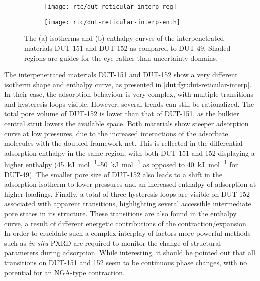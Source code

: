 \begin{figure}[htb]
    \centering
    \begin{subfigure}{0.5\linewidth}
        \texttt{[image: rtc/dut-reticular-interp-reg]}%
        \caption{}\label{dut:fgr:dut-reticular-interp-reg}
    \end{subfigure}%
    \begin{subfigure}{0.5\linewidth}
        \texttt{[image: rtc/dut-reticular-interp-enth]}%
        \caption{}\label{dut:fgr:dut-reticular-interp-enth}
    \end{subfigure}%
    \caption{The (a) isotherms and (b) enthalpy curves of the
    interpenetrated materials DUT-151 and DUT-152 as compared to 
    DUT-49. Shaded regions are guides for the eye rather than
    uncertainty domains.}%
    \label{dut:fgr:dut-reticular-interp}
\end{figure}

The interpenetrated materials DUT-151 and DUT-152 show a very different 
isotherm shape and enthalpy curve, as presented in 
\autoref{dut:fgr:dut-reticular-interp}. In their case, the adsorption
behaviour is very complex, with multiple transitions and 
hysteresis loops visible. However, several trends can still be rationalized.
The total pore volume of DUT-152 is lower than that of DUT-151, as 
the bulkier central strut lowers the available space. Both materials 
show steeper adsorption curve at low pressures, due to the increased 
interactions of the adsorbate molecules with the doubled framework
net. This is reflected in the differential adsorption enthalpy 
in the same region, with both DUT-151 and 152 displaying a higher
enthalpy (\SIrange{45}{50}{\kilo\joule\per\mol} as opposed to 
\SI{40}{\kilo\joule\per\mol} for DUT-49). The smaller pore size 
of DUT-152 also leads to a shift in the adsorption isotherm to
lower pressures and an increased enthalpy of adsorption at higher 
loadings. Finally, a total of three hysteresis loops are visible 
on DUT-152 associated with apparent transitions, highlighting several
accessible intermediate pore states in its structure. These transitions
are also found in the enthalpy curve, a result of different energetic
contributions of the contraction/expansion. In order to elucidate 
such a complex interplay of factors more powerful methods such
as \textit{in-situ} PXRD are required to monitor the change of
structural parameters during adsorption. While interesting,
it should be pointed out that all transitions on DUT-151 and 152 
seem to be continuous phase changes, with no potential for an
NGA-type contraction.

